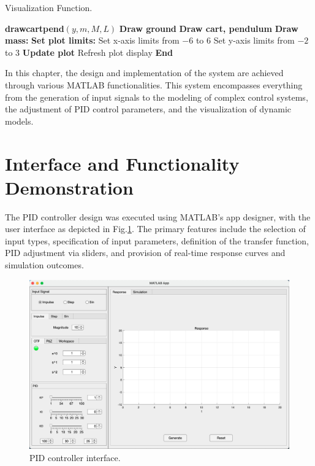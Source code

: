 \documentclass[journal,twoside,web]{ieeecolor}
\begin{document}
\begin{algorithm}[H]
\caption{Visualization Function.}\label{alg:drawcartpend}
\begin{algorithmic}
\STATE \textbf{drawcartpend}$(y, m, M, L)$
\STATE \hspace{0.5cm} \textbf{Draw ground}
\STATE \hspace{0.5cm} \textbf{Draw cart, pendulum}
\STATE \hspace{0.5cm} \textbf{Draw mass:}
\STATE \hspace{0.5cm} \textbf{Set plot limits:}
\STATE \hspace{1cm} Set x-axis limits from $-6$ to $6$
\STATE \hspace{1cm} Set y-axis limits from $-2$ to $3$
\STATE \hspace{0.5cm} \textbf{Update plot}
\STATE \hspace{1cm} Refresh plot display
\STATE \textbf{End}
\end{algorithmic}
\end{algorithm}

In this chapter, the design and implementation of the system are achieved through various MATLAB functionalities. This system encompasses everything from the generation of input signals to the modeling of complex control systems, the adjustment of PID control parameters, and the visualization of dynamic models.


\section{Interface and Functionality Demonstration}




The PID controller design was executed using MATLAB’s app designer, with the user interface as depicted in Fig.\ref{APP}. The primary features include the selection of input types, specification of input parameters, definition of the transfer function, PID adjustment via sliders, and provision of real-time response curves and simulation outcomes.

\begin{figure}[!t]
\centerline{\includegraphics[width=\columnwidth]{Images/App.jpg}}
\caption{PID controller interface.}
\label{APP}
\end{figure}
\end{document}
